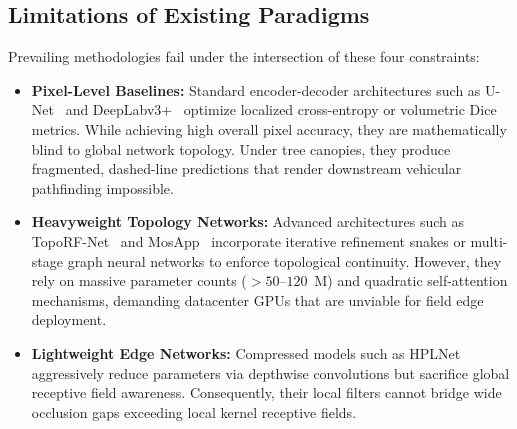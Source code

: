 \documentclass[conference]{IEEEtran}
\begin{document}
\subsection{Limitations of Existing Paradigms}
Prevailing methodologies fail under the intersection of these four constraints:
\begin{itemize}
    \item \textbf{Pixel-Level Baselines:} Standard encoder-decoder architectures such as U-Net~\cite{ronneberger2015unet} and DeepLabv3+~\cite{chen2017deeplab} optimize localized cross-entropy or volumetric Dice metrics. While achieving high overall pixel accuracy, they are mathematically blind to global network topology. Under tree canopies, they produce fragmented, dashed-line predictions that render downstream vehicular pathfinding impossible.
    \item \textbf{Heavyweight Topology Networks:} Advanced architectures such as TopoRF-Net~\cite{toporf2025} and MosApp~\cite{mosapp2024} incorporate iterative refinement snakes or multi-stage graph neural networks to enforce topological continuity. However, they rely on massive parameter counts ($>50\text{--}120$~M) and quadratic self-attention mechanisms, demanding datacenter GPUs that are unviable for field edge deployment.
    \item \textbf{Lightweight Edge Networks:} Compressed models such as HPLNet~\cite{hplnet2025} aggressively reduce parameters via depthwise convolutions but sacrifice global receptive field awareness. Consequently, their local filters cannot bridge wide occlusion gaps exceeding local kernel receptive fields.
\end{itemize}
\end{document}
